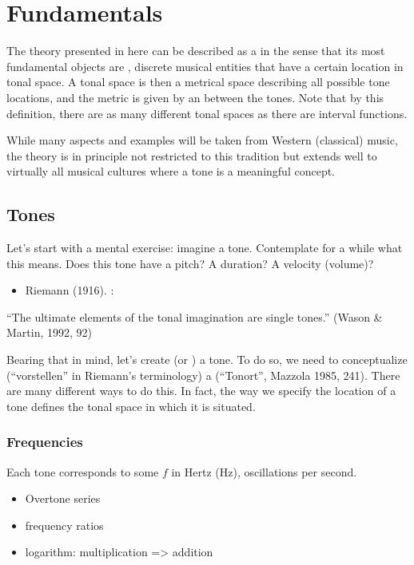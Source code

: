 \documentclass[letterpaper,10pt,english]{sphinxmanual}
\begin{document}
\chapter{Fundamentals}
\label{\detokenize{1_fundamentals:fundamentals}}\label{\detokenize{1_fundamentals::doc}}
The theory presented in here can be described as a  in the sense
that its most fundamental objects are , discrete musical entities that have
a certain location in tonal space.
A tonal space is then a metrical space describing all possible tone locations,
and the metric is given by an  between the tones. Note that by this definition,
there are as many different tonal spaces as there are interval functions.

While many aspects and examples will be taken
from Western (classical) music, the theory is in principle not restricted to this
tradition but extends well to virtually all musical cultures where a tone is a meaningful concept.


\section{Tones}
\label{\detokenize{1_fundamentals:tones}}
Let’s start with a mental exercise: imagine a tone.
Contemplate for a while what this means.
Does this tone have a pitch? A duration? A velocity (volume)?
\begin{itemize}
\item {} 
Riemann (1916). :

\end{itemize}

“The ultimate elements of the tonal imagination are single tones.” (Wason \& Martin, 1992, 92)

Bearing that in mind, let’s create (or ) a tone. To do so, we need to
conceptualize (“vorstellen” in Riemann’s terminology) a  (“Tonort”, Mazzola 1985, 241).
There are many different ways to do this. In fact, the way we specify the location of a tone
defines the tonal space in which it is situated.


\subsection{Frequencies}
\label{\detokenize{1_fundamentals:frequencies}}
Each tone corresponds to some  \(f\) in Hertz (Hz),
oscillations per second.
\begin{itemize}
\item {} 
Overtone series

\item {} 
frequency ratios

\item {} 
logarithm: multiplication =\textgreater{} addition

\end{itemize}
\end{document}

